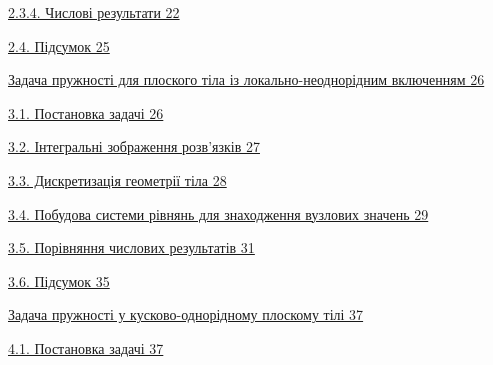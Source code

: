 \protect\hyperlink{ux447ux438ux441ux43bux43eux432ux456-ux440ux435ux437ux443ux43bux44cux442ux430ux442ux438-1}{2.3.4.
Числові результати 22}

\protect\hyperlink{ux43fux456ux434ux441ux443ux43cux43eux43a}{2.4.
Підсумок 25}

\protect\hyperlink{ux437ux430ux434ux430ux447ux430-ux43fux440ux443ux436ux43dux43eux441ux442ux456-ux434ux43bux44f-ux43fux43bux43eux441ux43aux43eux433ux43e-ux442ux456ux43bux430-ux456ux437-ux43bux43eux43aux430ux43bux44cux43dux43e-ux43dux435ux43eux434ux43dux43eux440ux456ux434ux43dux438ux43c-ux432ux43aux43bux44eux447ux435ux43dux43dux44fux43c}{Задача
пружності для плоского тіла із локально-неоднорідним включенням 26}

\protect\hyperlink{ux43fux43eux441ux442ux430ux43dux43eux432ux43aux430-ux437ux430ux434ux430ux447ux456-1}{3.1.
Постановка задачі 26}

\protect\hyperlink{ux456ux43dux442ux435ux433ux440ux430ux43bux44cux43dux456-ux437ux43eux431ux440ux430ux436ux435ux43dux43dux44f-ux440ux43eux437ux432ux44fux437ux43aux456ux432}{3.2.
Інтегральні зображення розв'язків 27}

\protect\hyperlink{ux434ux438ux441ux43aux440ux435ux442ux438ux437ux430ux446ux456ux44f-ux433ux435ux43eux43cux435ux442ux440ux456ux457-ux442ux456ux43bux430}{3.3.
Дискретизація геометрії тіла 28}

\protect\hyperlink{ux43fux43eux431ux443ux434ux43eux432ux430-ux441ux438ux441ux442ux435ux43cux438-ux440ux456ux432ux43dux44fux43dux44c-ux434ux43bux44f-ux437ux43dux430ux445ux43eux434ux436ux435ux43dux43dux44f-ux432ux443ux437ux43bux43eux432ux438ux445-ux437ux43dux430ux447ux435ux43dux44c-1}{3.4.
Побудова системи рівнянь для знаходження вузлових значень 29}

\protect\hyperlink{ux43fux43eux440ux456ux432ux43dux44fux43dux43dux44f-ux447ux438ux441ux43bux43eux432ux438ux445-ux440ux435ux437ux443ux43bux44cux442ux430ux442ux456ux432}{3.5.
Порівняння числових результатів 31}

\protect\hyperlink{ux43fux456ux434ux441ux443ux43cux43eux43a-1}{3.6.
Підсумок 35}

\protect\hyperlink{ux437ux430ux434ux430ux447ux430-ux43fux440ux443ux436ux43dux43eux441ux442ux456-ux443-ux43aux443ux441ux43aux43eux432ux43e-ux43eux434ux43dux43eux440ux456ux434ux43dux43eux43cux443-ux43fux43bux43eux441ux43aux43eux43cux443-ux442ux456ux43bux456}{Задача
пружності у кусково-однорідному плоскому тілі 37}

\protect\hyperlink{ux43fux43eux441ux442ux430ux43dux43eux432ux43aux430-ux437ux430ux434ux430ux447ux456-2}{4.1.
Постановка задачі 37}

